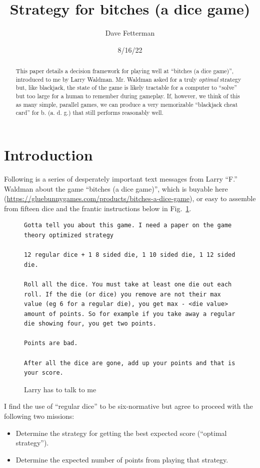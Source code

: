 \documentclass[11pt, oneside]{article} 	%
\title{Strategy for bitches (a dice game)}
\author{Dave Fetterman}
\affil{Obviously Unemployed}
\date{8/16/22}
\begin{document}
\maketitle

\begin{abstract}

This paper details a decision framework for playing well at ``bitches (a dice game)'', introduced to me by Larry Waldman. Mr. Waldman asked for a truly \emph{optimal} strategy but, like blackjack, the state of the game is likely tractable for a computer to ``solve'' but too large for a human to remember during gameplay. If, however, we think of this as many simple, parallel games, we can produce a very memorizable ``blackjack cheat card'' for b. (a. d. g.) that still performs reasonably well.

\end{abstract}

\section{Introduction}

Following is a series of desperately important text messages from Larry ``F.'' Waldman about the game ``bitches (a dice game)'', which is buyable here (\url{https://gluebunnygames.com/products/bitches-a-dice-game}), or easy to assemble from fifteen dice and the frantic instructions below in Fig.~\ref{fig:larry2}.

\begin{figure}[!htb]
\begin{lstlisting}
Gotta tell you about this game. I need a paper on the game theory optimized strategy

12 regular dice + 1 8 sided die, 1 10 sided die, 1 12 sided die. 

Roll all the dice. You must take at least one die out each roll. If the die (or dice) you remove are not their max value (eg 6 for a regular die), you get max - <die value> amount of points. So for example if you take away a regular die showing four, you get two points. 

Points are bad. 

After all the dice are gone, add up your points and that is your score.
\end{lstlisting}
\caption{Larry has to talk to me}
\label{fig:larry2}
\end{figure}

I find the use of ``regular dice'' to be six-normative but agree to proceed with the following two missions:
\begin{itemize}
\item Determine the strategy for getting the best expected score (``optimal strategy'').
\item Determine the expected number of points from playing that strategy.
\end{itemize}
\end{document}

